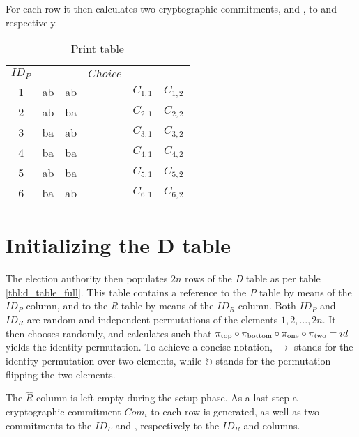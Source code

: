For each row it then calculates two cryptographic commitments, \ctop{} and
\cbottom{}, to \ptop{} and \pbottom{} respectively.

\begin{table}
	\centering
	\begin{tabular}{|c|c|c|c|c|c|}
		\hline
		$ID_P$ & \ptop & \pbottom & $Choice$ & \ctop & \cbottom \\
		\hline
		1 & ab & ab & & $C_{1, 1}$ & $C_{1, 2}$ \\
		2 & ab & ba & & $C_{2, 1}$ & $C_{2, 2}$ \\
		3 & ba & ab & & $C_{3, 1}$ & $C_{3, 2}$ \\
		4 & ba & ba & & $C_{4, 1}$ & $C_{4, 2}$ \\
		5 & ab & ba & & $C_{5, 1}$ & $C_{5, 2}$ \\
		6 & ba & ab & & $C_{6, 1}$ & $C_{6, 2}$ \\
		\hline
	\end{tabular}
	\label{tbl:p_table_full}
	\caption{Print table}
\end{table}

\section{Initializing the \textbf{D} table}

The election authority then populates $2n$ rows of the \emph{D} table as per
table \ref{tbl:d_table_full}. This table contains a reference to the \emph{P}
table by means of the $ID_P$ column, and to the \emph{R} table by means of the
$ID_R$ column. Both $ID_P$ and $ID_R$ are random and independent permutations
of the elements $1, 2, \ldots, 2n$. It then chooses \pone{} randomly, and
calculates \ptwo{} such that $\pi_{\text{top}} \circ \pi_{\text{bottom}} \circ \pi_{\text{one}} \circ \pi_{\text{two}} =
id$ yields the identity permutation. To achieve a concise notation,
$\rightarrow$ stands for the identity permutation over two elements, while
$\circlearrowright$ stands for the permutation flipping the two elements.

The $\hat{R}$ column is left empty during the setup phase. As a last step a
cryptographic commitment $Com_i$ to each row is generated, as well as two
commitments to the $ID_P$ and \pone{}, respectively to the $ID_R$ and \ptwo{}
columns.

